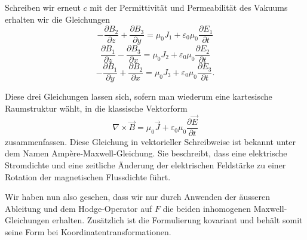 Schreiben wir erneut $c$ mit der Permittivität und Permeabilität des Vakuums erhalten wir die Gleichungen
\begin{equation}
	 - \frac{\partial B_2}{\partial z} + \frac{\partial B_3}{\partial y} = \mu_0 J_1 + \varepsilon_0\mu_0\frac{\partial E_1}{\partial t}
\end{equation}
\begin{equation}
 	\frac{\partial B_1}{\partial z} - \frac{\partial B_3}{\partial x} = \mu_0 J_2	+ \varepsilon_0\mu_0\frac{\partial E_2}{\partial t}
\end{equation}
\begin{equation}
	 - \frac{\partial B_1}{\partial y} + \frac{\partial B_2}{\partial x} = \mu_0 J_3 + \varepsilon_0\mu_0\frac{\partial E_3}{\partial t}.
\end{equation}

Diese drei Gleichungen lassen sich, sofern man wiederum eine kartesische Raumstruktur wählt, in die klassische Vektorform 
\begin{equation}
	\nabla \times \vec{B} = \mu_0 \vec{J} + \varepsilon_0 \mu_0 \frac{\partial \vec{E}}{\partial t}
\end{equation}
zusammenfassen.
Diese Gleichung in vektorieller Schreibweise ist bekannt unter dem Namen Ampère-Maxwell-Gleichung.
Sie beschreibt, dass eine elektrische Stromdichte und eine zeitliche Änderung der elektrischen Feldstärke zu einer Rotation der magnetischen Flussdichte führt.

Wir haben nun also gesehen, dass wir nur durch Anwenden der äusseren Ableitung und dem Hodge-Operator auf $F$ die beiden inhomogenen Maxwell-Gleichungen erhalten. Zusätzlich ist die Formulierung kovariant und behält somit seine Form bei Koordinatentransformationen.
